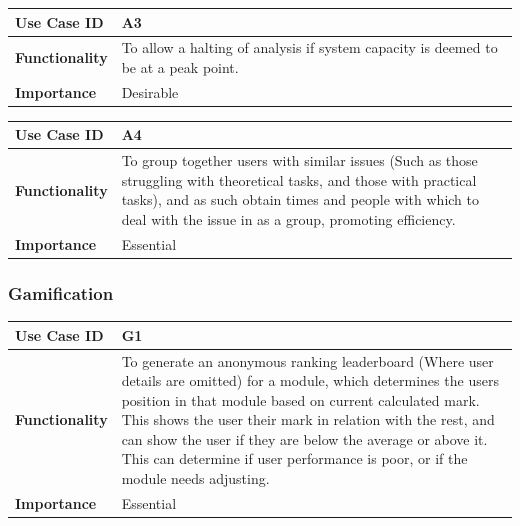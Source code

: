 \documentclass[a4paper,12pt]{article}
\begin{document}
        	\begin{center}
        		\begin{tabularx}{\textwidth}{ |X|X| }
        			
        			\hline
        			\textbf{Use Case ID} & A3 \\
        			\hline
        			\textbf{Functionality} & To allow a halting of analysis if system capacity is deemed to be at a peak point. \\
        			\hline
        			\textbf{Importance} & Desirable \\
        			\hline
        			
        		\end{tabularx}
        	\end{center}
        	
        	\begin{center}
        		\begin{tabularx}{\textwidth}{ |X|X| }
        			
        			\hline
        			\textbf{Use Case ID} & A4 \\
        			\hline
        			\textbf{Functionality} & To group together users with similar issues (Such as those struggling with theoretical tasks, and those with practical tasks), and as such obtain times and people with which to deal with the issue in as a group, promoting efficiency. \\
        			\hline
        			\textbf{Importance} & Essential \\
        			\hline
        			
        		\end{tabularx}
        	\end{center}
        
        	\subsubsection{Gamification}
        	
        	\begin{center}
        		\begin{tabularx}{\textwidth}{ |X|X| }
        			
        			\hline
        			\textbf{Use Case ID} & G1 \\
        			\hline
        			\textbf{Functionality} & To generate an anonymous ranking leaderboard (Where user details are omitted) for a module, which determines the users position in that module based on current calculated mark. This shows the user their mark in relation with the rest, and can show the user if they are below the average or above it. This can determine if user performance is poor, or if the module needs adjusting. \\
        			\hline
        			\textbf{Importance} & Essential \\
        			\hline
        			
        		\end{tabularx}
        	\end{center}
        	
\end{document}
